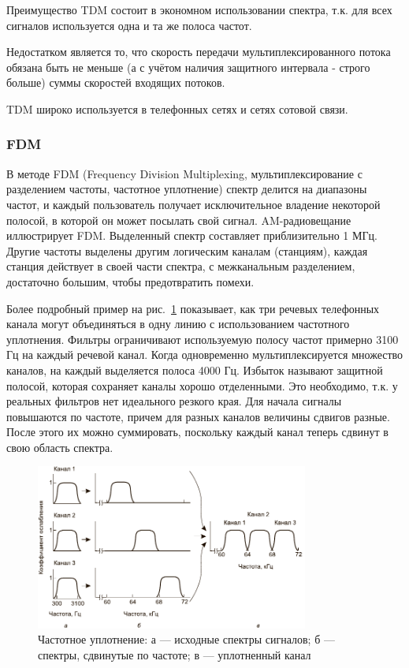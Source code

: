 Преимущество TDM состоит в экономном использовании спектра, т.к. для всех сигналов используется одна и та же полоса частот.

Недостатком является то, что скорость передачи мультиплексированного потока обязана быть не меньше (а с учётом наличия защитного интервала - строго больше) суммы скоростей входящих потоков.

TDM широко используется в телефонных сетях и сетях сотовой связи.

\subsubsection{FDM}

В методе FDM (Frequency Division Multiplexing, мультиплексирование с разделением частоты, частотное уплотнение) спектр делится на диапазоны частот, и каждый пользователь получает исключительное владение некоторой полосой, в которой он может посылать свой сигнал.
AM-радиовещание иллюстрирует FDM.
Выделенный спектр составляет приблизительно 1 МГц.
Другие частоты выделены другим логическим каналам (станциям), каждая станция действует в своей части спектра, с межканальным разделением, достаточно большим, чтобы предотвратить помехи.

Более подробный пример на рис.~\ref{fdm} показывает, как три речевых телефонных канала могут объединяться в одну линию с использованием частотного уплотнения.
Фильтры ограничивают используемую полосу частот примерно 3100 Гц на каждый речевой канал.
Когда одновременно мультиплексируется множество каналов, на каждый выделяется полоса 4000 Гц.
Избыток называют защитной полосой, которая сохраняет каналы хорошо отделенными.
Это необходимо, т.к. у реальных фильтров нет идеального резкого края.
Для начала сигналы повышаются по частоте, причем для разных каналов величины сдвигов разные.
После этого их можно суммировать, поскольку каждый канал теперь сдвинут в свою область спектра.

\begin{figure}[h]
\centering
\includegraphics[width = 0.8\textwidth]{fdm.pdf}
\caption{Частотное уплотнение: а — исходные спектры сигналов; б — спектры, сдвинутые по частоте; в — уплотненный канал}
\label{fdm}
\end{figure}

